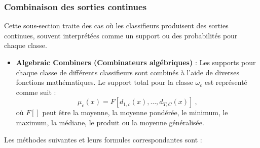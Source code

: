 \subsubsection*{Combinaison des sorties continues}

Cette sous-section traite des cas où les classifieurs produisent des sorties continues, souvent interprétées comme un support ou des probabilités pour chaque classe.

\begin{itemize}
	\item \textbf{Algebraic Combiners (Combinateurs algébriques)} : Les supports pour chaque classe de différents classifieurs sont combinés à l'aide de diverses fonctions mathématiques. Le support total pour la classe $\omega_c$ est représenté comme suit :
	\[
	\mu_c(x) = F [d_{1,c}(x), \ldots, d_{T,C}(x)]~,
	\]
	où $F[]$ peut être la moyenne, la moyenne pondérée, le minimum, le maximum, la médiane, le produit ou la moyenne généralisée.
\end{itemize}
Les méthodes suivantes et leurs formules correspondantes sont :


